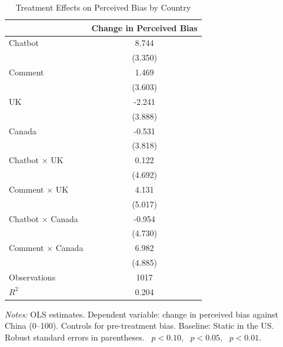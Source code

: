\begin{table}[htbp]
\centering
\caption{Treatment Effects on Perceived Bias by Country}
\label{tab:nation}
\begin{tabular}{lc}
\toprule
 & Change in Perceived Bias \\
\midrule
Chatbot             &       8.744\sym{***}\\
                    &     (3.350)         \\
\addlinespace
Comment             &       1.469         \\
                    &     (3.603)         \\
\addlinespace
UK                  &      -2.241         \\
                    &     (3.888)         \\
\addlinespace
Canada              &      -0.531         \\
                    &     (3.818)         \\
\addlinespace
Chatbot $\times$ UK &       0.122         \\
                    &     (4.692)         \\
\addlinespace
Comment $\times$ UK &       4.131         \\
                    &     (5.017)         \\
\addlinespace
Chatbot $\times$ Canada&      -0.954         \\
                    &     (4.730)         \\
\addlinespace
Comment $\times$ Canada&       6.982         \\
                    &     (4.885)         \\
\midrule
Observations        &        1017         \\
$R^2$               &       0.204         \\
\bottomrule
\end{tabular}
\par\vspace{4pt}
\begin{minipage}{\textwidth}
\footnotesize \textit{Notes:} OLS estimates. Dependent variable: change in perceived bias against China (0--100). Controls for pre-treatment bias. Baseline: Static in the US. Robust standard errors in parentheses. \sym{*}~$p<0.10$, \sym{**}~$p<0.05$, \sym{***}~$p<0.01$.
\end{minipage}
\end{table}
